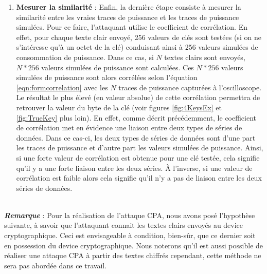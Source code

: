 \documentclass[oneside]{book}
\begin{document}
\begin{enumerate}
\item \textbf{Mesurer la similarité} : Enfin, la dernière étape consiste à mesurer la similarité entre les vraies traces de puissance et les traces de puissance simulées. Pour ce faire, l'attaquant utilise le coefficient de corrélation. En effet, pour chaque texte clair envoyé, 256 valeurs de clés sont testées (si on ne s'intéresse qu'à un octet de la clé) conduisant ainsi à 256 valeurs simulées de consommation de puissance. Dans ce cas, si $N$ textes clairs sont envoyés, $N*256$ valeurs simulées de puissance sont calculées. Ces $N*256$ valeurs simulées de puissance sont alors corrélées selon l'équation \ref{eqn:formcorrelation} avec les $N$ traces de puissance capturées à l'oscilloscope. Le résultat le plus élevé (en valeur absolue) de cette corrélation permettra de retrouver la valeur du byte de la clé (voir figures \ref{fig:4KeysEx} et \ref{fig:TrueKey} plus loin). En effet, comme décrit précédemment, le coefficient de corrélation met en évidence une liaison entre deux types de séries de données. Dans ce cas-ci, les deux types de séries de données sont d'une part les traces de puissance et d'autre part les valeurs simulées de puissance. Ainsi, si une forte valeur de corrélation est obtenue pour une clé testée, cela signifie qu'il y a une forte liaison entre les deux séries. À l'inverse, si une valeur de corrélation est faible alors cela signifie qu'il n'y a pas de liaison entre les deux séries de données. \\ \\
\end{enumerate}

\hspace{-0.5 cm}\textbf{\textit{Remarque}} : Pour la réalisation de l'attaque CPA, nous avons posé l'hypothèse suivante, à savoir que l'attaquant connait les textes clairs envoyés au device cryptographique. Ceci est envisageable à condition, bien-sûr, que ce dernier soit en possession du device cryptographique. Nous noterons qu'il est aussi possible de réaliser une attaque CPA à partir des textes chiffrés cependant, cette méthode ne sera pas abordée dans ce travail.

\newpage
\end{document}
